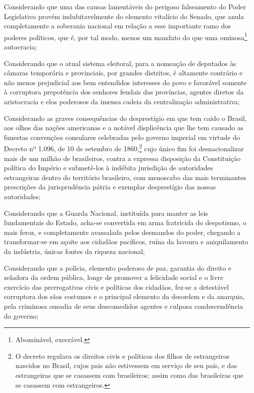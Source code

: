 Considerando que uma das causas lamentáveis do perigoso falseamento do
Poder Legislativo provém indubitavelmente do elemento vitalício do
Senado, que anula completamente a soberania nacional em relação a esse
importante ramo dos poderes políticos, que é, por tal modo, menos um
mandato do que uma ominosa\footnote{Abominável, execrável.}
autocracia;

Considerando que o atual sistema eleitoral, para a nomeação de deputados
às câmaras temporária e provinciais, por grandes distritos, é altamente
contrário e não menos prejudicial aos bem entendidos interesses do povo
e favorável somente à corruptora prepotência dos senhores feudais das
províncias, agentes diretos da aristocracia e elos poderosos da imensa
cadeia da centralização administrativa;

Considerando as graves consequências do desprestígio em que tem caído o
Brasil, aos olhos das nações americanas e a notável displicência que lhe
tem causado as funestas convenções consulares celebradas pelo governo
imperial em virtude do Decreto nº 1.096, de 10 de setembro de
1860,\footnote{O decreto regulava os direitos civis e políticos dos
  filhos de estrangeiros nascidos no Brasil, cujos pais não estivessem
  em serviço de seu país, e das estrangeiras que se casassem com
  brasileiros; assim como das brasileiras que se casassem com
  estrangeiros.} cujo único fim foi desnacionalizar mais de um milhão de
brasileiros, contra a expressa disposição da Constituição política do
Império e submetê-los à indébita jurisdição de autoridades estrangeiras
dentro do território brasileiro, com menoscabo das mais terminantes
prescrições da jurisprudência pátria e exemplar desprestígio das nossas
autoridades;

Considerando que a Guarda Nacional, instituída para manter as leis
fundamentais do Estado, acha-se convertida em arma fratricida do
despotismo, o mais feroz, e completamente avassalada pelos desmandos do
poder, chegando a transformar-se em açoite aos cidadãos pacíficos, ruína
da lavoura e aniquilamento da indústria, únicas fontes da riqueza
nacional;

Considerando que a polícia, elemento poderoso de paz, garantia do
direito e zeladora da ordem pública, longe de promover a felicidade
social e o livre exercício das prerrogativas civis e políticas dos
cidadãos, fez-se a detestável corruptora dos sãos costumes e o principal
elemento da desordem e da anarquia, pela criminosa ousadia de seus
descomedidos agentes e culposa condescendência do governo;

